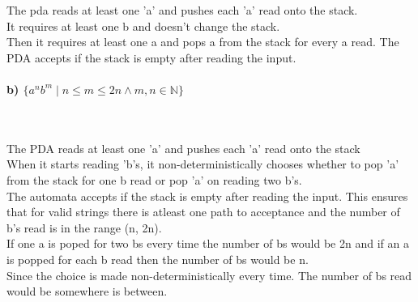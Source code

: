 \documentclass[11pt]{article}
\begin{document}
The pda reads at least one 'a' and pushes each 'a' read onto the stack. \\
It requires at least one b and doesn't change the stack. \\
Then it requires at least one a and pops a from the stack for every a read.
The PDA accepts if the stack is empty after reading the input. \\
\\
\textbf{b) $\{a^nb^m \;|\; n \leq m \leq 2n \land m, n \in \mathbb{N}\}$} \\
\\
\\
The PDA reads at least one 'a' and pushes each 'a' read onto the stack \\
When it starts reading 'b's, it non-deterministically chooses whether to pop 'a'
from the stack for one b read or pop 'a' on reading two b's. \\
The automata accepts if the stack is empty after reading the input.
This ensures that for valid strings there is atleast one path to acceptance
and the number of b's read is in the range (n, 2n). \\
If one a is poped for two bs every time the number of bs would be 2n
and if an a is popped for each b read then the number of bs would be n. \\
Since the choice is made non-deterministically every time. The number of bs
read would be somewhere is between.
\end{document}

